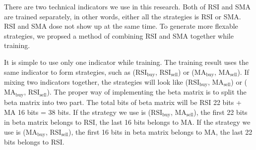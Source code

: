 \documentclass[../Proposed Method.tex]{subfiles}
\begin{document}
There are two technical indicators we use in this research. Both of RSI and SMA are trained separately, in other words, either all the strategies is RSI or SMA. RSI and SMA dose not show up at the same time. To generate more flexable strategies, we propsed a method of combining RSI and SMA together while training.

\bigbreak

It is simple to use only one indicator while training. The training result uses the same indicator to form strategies, such as ($\text{RSI}_\text{buy}$, $\text{RSI}_\text{sell}$) or ($\text{MA}_\text{buy}$, $\text{MA}_\text{sell}$). If mixing two indicators together, the strategies will look like ($\text{RSI}_\text{buy}$, $\text{MA}_\text{sell}$) or ($\text{MA}_\text{buy}$, $\text{RSI}_\text{sell}$).
The proper way of implementing the beta matrix is to split the beta matrix into two part. The total bits of beta matrix will be RSI 22 bits + MA 16 bits = 38 bits. If the strategy we use is ($\text{RSI}_\text{buy}$, $\text{MA}_\text{sell}$), the first 22 bits in beta matrix belongs to RSI, the last 16 bits belongs to MA. If the strategy we use is ($\text{MA}_\text{buy}$, $\text{RSI}_\text{sell}$), the first 16 bits in beta matrix belongs to MA, the last 22 bits belongs to RSI.
\end{document}
